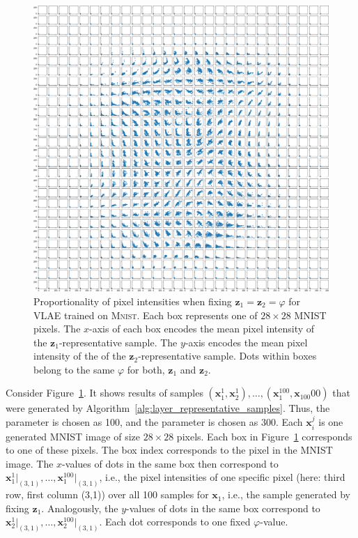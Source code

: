 \begin{figure}
    \centering
    \includegraphics[width=\textwidth]{images/notprop/mnist/vlae/ccs_0_1_vlae.png}
    \caption[\ac{VLAE} on \textsc{Mnist} - Pixel proportionality]{Proportionality of pixel intensities when fixing $\bm{z}_1 = \bm{z}_2=\varphi$ for \ac{VLAE} trained on \textsc{Mnist}. Each box represents one of $28\times 28$ MNIST pixels. The $x$-axis of each box encodes the mean pixel intensity of the $\bm{z}_1$-representative sample. The $y$-axis encodes the mean pixel intensity of the of the $\bm{z}_2$-representative sample. Dots within boxes belong to the same $\varphi$ for both, $\bm{z}_1$ and $\bm{z}_2$. }
    \label{fig:notprop}
\end{figure}

Consider Figure~\ref{fig:notprop}.
It shows results of samples $(\bm{x}_1^1,\bm{x}_2^1),\dots,(\bm{x}_1^{100},\bm{x}_{100}00)$ that were generated by Algorithm~\ref{alg:layer_representative_samples}.
Thus, the parameter  is chosen as 100, and the parameter  is chosen as 300.
Each $\bm{x}_i^j$ is one generated MNIST image of size $28\times 28$ pixels.
Each box in Figure~\ref{fig:notprop} corresponds to one of these pixels.
The box index corresponds to the pixel in the MNIST image.
The $x$-values of dots in the same box then correspond to $\bm{x}_1^1\big|_{(3,1)}, \dots, \bm{x}_1^{100}\big|_{(3,1)}$, i.e., the pixel intensities of one specific pixel (here: third row, first column (3,1)) over all 100 samples for $\bm{x}_1$, i.e., the sample generated by fixing $\bm{z}_1$.
Analogously, the $y$-values of dots in the same box correspond to $\bm{x}_2^1\big|_{(3,1)}, \dots, \bm{x}_2^{100}\big|_{(3,1)}$.
Each dot corresponds to one fixed $\varphi$-value.

